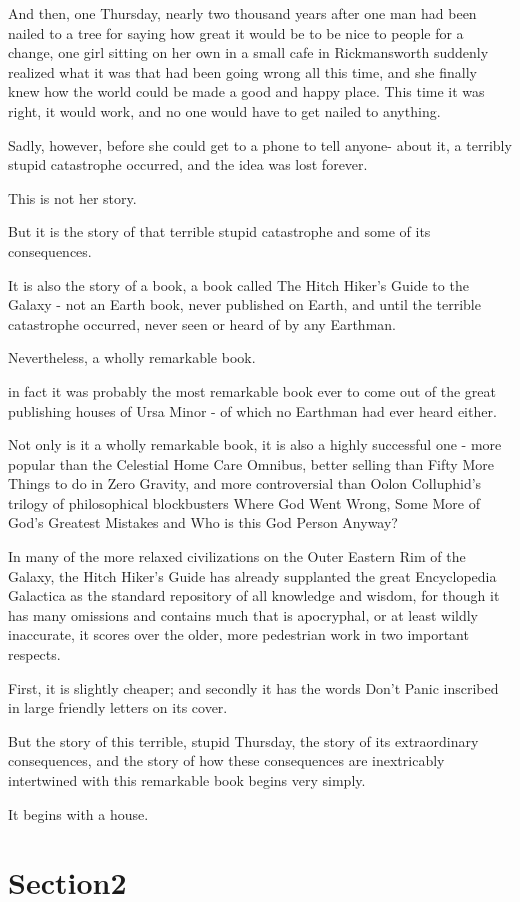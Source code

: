 And then, one Thursday, nearly two thousand years after  one  man had  been
nailed to a tree for saying how great it would be to be nice to people for a
change, one girl sitting on  her  own  in  a small  cafe  in  Rickmansworth
suddenly realized what it was that had been going wrong all this time, and she
finally knew how  the world  could  be  made  a  good and happy place. This
time it was right, it would work, and no one would  have  to  get  nailed  to
anything.

Sadly, however, before she could get to a phone  to  tell  anyone- about  it,
a  terribly stupid catastrophe occurred, and the idea was lost forever.

This is not her story.

But it is the story of that terrible stupid catastrophe and  some of its
consequences.

It is also the story of a book, a book called The  Hitch  Hiker's Guide  to
the  Galaxy  -  not  an Earth book, never published on Earth, and until the
terrible catastrophe occurred, never seen or heard of by any Earthman.

Nevertheless, a wholly remarkable book.

in fact it was probably the most remarkable book ever to come out of  the
great  publishing  houses  of  Ursa  Minor - of which no Earthman had ever
heard either.

Not only is it a wholly remarkable book,  it  is  also  a  highly successful
one  -  more  popular  than  the  Celestial Home Care Omnibus, better selling
than Fifty More  Things  to  do  in  Zero Gravity, and more controversial than
Oolon Colluphid's trilogy of philosophical blockbusters Where God Went  Wrong,
Some  More  of God's Greatest Mistakes and Who is this God Person Anyway?

In many of the more relaxed civilizations on  the  Outer  Eastern Rim of the
Galaxy, the Hitch Hiker's Guide has already supplanted the great Encyclopedia
Galactica as the  standard  repository  of all  knowledge  and  wisdom, for
though it has many omissions and contains much that is apocryphal, or at least
wildly  inaccurate, it  scores  over the older, more pedestrian work in two
important respects.

First, it is slightly cheaper; and  secondly  it  has  the  words Don't Panic
inscribed in large friendly letters on its cover.

But the story of this terrible, stupid Thursday, the story of its extraordinary
consequences,   and   the  story   of  how  these consequences are inextricably
intertwined  with  this  remarkable book begins very simply.

It begins with a house.

\section{Section2}
\label{sec:section2}
